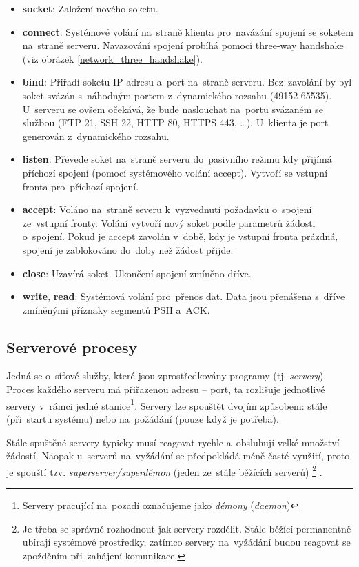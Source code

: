 \begin{itemize}
\item \textbf{socket}: Založení nového soketu.
\item \textbf{connect}: Systémové volání na~straně klienta pro~navázání spojení se soketem na~straně serveru. Navazování spojení probíhá pomocí three-way handshake (viz obrázek \ref{network_three_handshake}).
\item \textbf{bind}: Přiřadí soketu IP adresu a~port na~straně serveru. Bez~zavolání by byl soket svázán s~náhodným portem z~dynamického rozsahu (49152-65535). U~serveru se ovšem očekává, že bude naslouchat na~portu svázaném se službou (FTP 21, SSH 22, HTTP 80, HTTPS 443, \dots). U~klienta je port generován z~dynamického rozsahu.
\item \textbf{listen}: Převede soket na~straně serveru do~pasivního režimu kdy přijímá příchozí spojení (pomocí systémového volání accept). Vytvoří se vstupní fronta pro~příchozí spojení.
\item \textbf{accept}: Voláno na~straně severu k~vyzvednutí požadavku o~spojení ze~vstupní fronty. Volání vytvoří nový soket podle parametrů žádosti o~spojení. Pokud je accept zavolán v~době, kdy je vstupní fronta prázdná, spojení je zablokováno do~doby než žádost přijde.
\item \textbf{close}: Uzavírá soket. Ukončení spojení zmíněno dříve.
\item \textbf{write}, \textbf{read}: Systémová volání pro~přenos dat. Data jsou přenášena s~dříve zmíněnými příznaky segmentů PSH a~ACK.
\end{itemize}

\subsection{Serverové procesy}

Jedná se o~síťové služby, které jsou zprostředkovány programy (tj. \emph{servery}). Proces každého serveru má přiřazenou adresu -- port, ta rozlišuje jednotlivé servery v~rámci jedné stanice\footnote{Servery pracující na~pozadí označujeme jako \emph{démony} (\emph{daemon})}. Servery lze spouštět dvojím způsobem: stále (při~startu systému) nebo na~požádání (pouze když je potřeba).

Stále spuštěné servery typicky musí reagovat rychle a~obsluhují velké množství žádostí. Naopak u~serverů na~vyžádání se předpokládá méně časté využití, proto je spouští tzv. \emph{superserver/superdémon} (jeden ze~stále běžících serverů)%
\footnote{Je třeba se správně rozhodnout jak servery rozdělit. Stále běžící permanentně ubírají systémové prostředky, zatímco servery na~vyžádání budou reagovat se zpožděním při~zahájení komunikace.}%
.


